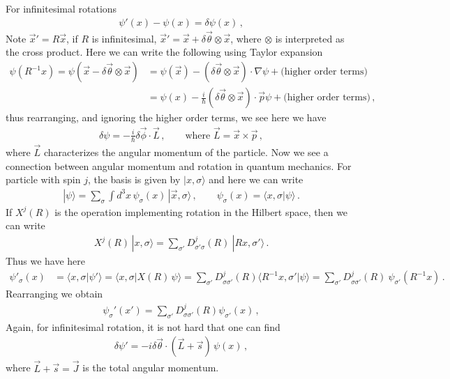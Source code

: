 \documentclass[11pt, onesided]{book}
\theoremstyle{break}
\theoremstyle{break}
\begin{document}
For infinitesimal rotations
\begin{align*}
\psi'(x) - \psi(x) = \delta \psi(x)\,,
\end{align*}
Note $\vec{x}' = R\vec{x}$, if $R$ is infinitesimal, $\vec{x}' = \vec{x} + \delta \vec{\theta} \otimes \vec{x}$, where $\otimes$ is interpreted as the cross product. Here we can write the following using Taylor expansion
\begin{align*}
\psi(R^{-1} x)  = \psi(\vec{x} - \delta \vec{\theta}\otimes \vec{x}) 
&= \psi(\vec{x}) - (\delta \vec{\theta} \otimes \vec{x}) \cdot \nabla \psi+ \text{(higher order terms)}\\
&=\psi(x) - \frac{i}{\hbar}( \delta \vec{\theta} \otimes \vec{x}) \cdot \vec{p} \psi + \text{(higher order terms)}\,,
\end{align*}
thus rearranging, and ignoring the higher order terms, we see here we have
\begin{align*}
\delta \psi = -\frac{i}{\hbar} \delta \vec{\phi}\cdot \vec{L}\,,\qquad \text{where } \vec{L} = \vec{x}\times \vec{p}\,,
\end{align*}
where $\vec{L}$ characterizes the angular momentum of the particle. Now we see a connection between angular momentum and rotation in quantum mechanics. For particle with spin $j$, the basis is given by $|x, \sigma\rangle$ and here we can write
\begin{align*}
|\psi \rangle = \sum_{\sigma} \int d^3x\, \psi_{\sigma}(x) \, |\vec{x},\sigma\rangle\,,\qquad \psi_\sigma (x) = \langle x,\sigma | \psi\rangle\,.
\end{align*}
If $X^j(R)$ is the operation implementing rotation in the Hilbert space, then we can write
\begin{align*}
X^j(R) \,|x,\sigma\rangle = \sum_{\sigma'} D^j_{\sigma'\sigma}(R) \ | Rx,\sigma'\rangle\,.
\end{align*}
Thus we have here
\begin{align*}
\psi'_{\sigma}(x) &= \langle x,\sigma | \psi'\rangle = \langle x,\sigma | X(R)\,\psi\rangle = \sum_{\sigma'}D^j_{\sigma \sigma'}(R) \langle R^{-1} x,\sigma '|\psi\rangle= \sum_{\sigma '} D^j_{\sigma \sigma'}(R)\ \psi_{\sigma'} (R^{-1} x)\,.
\end{align*}
Rearranging we obtain
\begin{align*}
\psi_\sigma'(x') = \sum_{\sigma'}D^j_{\sigma\sigma'}(R) \psi_{\sigma'}(x)\,,
\end{align*}
Again, for infinitesimal rotation, it is not hard that one can find
\begin{align*}
\delta \psi' = -i\delta \vec{\theta} \cdot (\vec{L}+\vec{s}) \,\psi(x)\,,
\end{align*}
where $\vec{L} + \vec{s} = \vec{J}$ is the total angular momentum. \\
\end{document}
